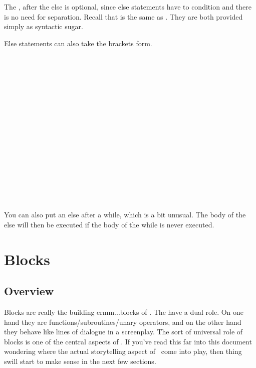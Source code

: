The , after the else is optional, since else statements have to condition and there is no need for separation.  Recall that  is the same as .  They are both provided simply as syntactic sugar. 

Else statements can also take the brackets form.

\begin{SSCodeBox}
 \\
\scitea{} \\
\scitea{\{} \\
 \\
\scitea{\}} \\
\scitea{} \\
\scitea{} \\
\scitea{} \\
 \\
\scitea{\{} \\
 \\
\scitea{\}} \\
\scitea{} \\
\scitea{\{} \\
 \\
\scitea{\}}
\end{SSCodeBox}

You can also put an else after a while, which is a bit unusual.  The body of the else will then be executed if the body of the while is never executed.


%
%
\chapter{Blocks}

\section{Overview}

Blocks are really the building ermm...blocks of \SSquared{}.  The have a dual role.  On one hand they are functions/subroutines/unary operators, and on the other hand they behave like lines of dialogue in a screenplay.  The sort of universal role of blocks is one of the central aspects of \SSquared{}.  If you've read this far into this document wondering where the actual storytelling aspect of \SSquared\ come into play, then thing swill start to make sense in the next few sections.

